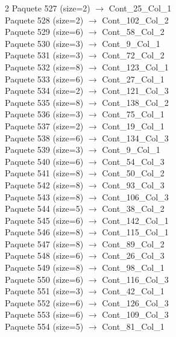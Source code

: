 \begin{multicols}{2}
Paquete 527 (size=2) $\rightarrow$ Cont\_25\_Col\_1\\
Paquete 528 (size=2) $\rightarrow$ Cont\_102\_Col\_2\\
Paquete 529 (size=6) $\rightarrow$ Cont\_58\_Col\_2\\
Paquete 530 (size=3) $\rightarrow$ Cont\_9\_Col\_1\\
Paquete 531 (size=3) $\rightarrow$ Cont\_72\_Col\_2\\
Paquete 532 (size=8) $\rightarrow$ Cont\_123\_Col\_1\\
Paquete 533 (size=6) $\rightarrow$ Cont\_27\_Col\_1\\
Paquete 534 (size=2) $\rightarrow$ Cont\_121\_Col\_3\\
Paquete 535 (size=8) $\rightarrow$ Cont\_138\_Col\_2\\
Paquete 536 (size=3) $\rightarrow$ Cont\_75\_Col\_1\\
Paquete 537 (size=2) $\rightarrow$ Cont\_19\_Col\_1\\
Paquete 538 (size=6) $\rightarrow$ Cont\_134\_Col\_3\\
Paquete 539 (size=3) $\rightarrow$ Cont\_9\_Col\_1\\
Paquete 540 (size=6) $\rightarrow$ Cont\_54\_Col\_3\\
Paquete 541 (size=8) $\rightarrow$ Cont\_50\_Col\_2\\
Paquete 542 (size=8) $\rightarrow$ Cont\_93\_Col\_3\\
Paquete 543 (size=8) $\rightarrow$ Cont\_106\_Col\_3\\
Paquete 544 (size=5) $\rightarrow$ Cont\_38\_Col\_2\\
Paquete 545 (size=6) $\rightarrow$ Cont\_142\_Col\_1\\
Paquete 546 (size=8) $\rightarrow$ Cont\_115\_Col\_1\\
Paquete 547 (size=8) $\rightarrow$ Cont\_89\_Col\_2\\
Paquete 548 (size=6) $\rightarrow$ Cont\_26\_Col\_3\\
Paquete 549 (size=8) $\rightarrow$ Cont\_98\_Col\_1\\
Paquete 550 (size=6) $\rightarrow$ Cont\_116\_Col\_3\\
Paquete 551 (size=3) $\rightarrow$ Cont\_42\_Col\_1\\
Paquete 552 (size=6) $\rightarrow$ Cont\_126\_Col\_3\\
Paquete 553 (size=6) $\rightarrow$ Cont\_109\_Col\_3\\
Paquete 554 (size=5) $\rightarrow$ Cont\_81\_Col\_1\\

\end{multicols}
